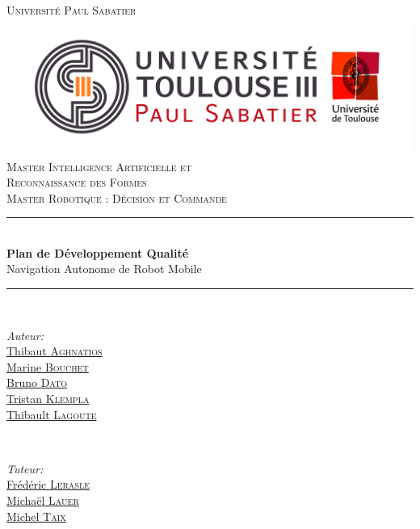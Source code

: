 \documentclass[10pt,a4paper]{article}
\begin{document}
\pagestyle {plain}

\begin{titlepage}


\newcommand{\HRule}{\rule{\linewidth}{0.5mm}} 

\center

\textsc{\Large Université Paul Sabatier}\\[1cm] 
\includegraphics[scale=0.3]{UPS.jpg}\\[0.6cm] 


\textsc{Master Intelligence Artificielle et \\ 
Reconnaissance des Formes \\ Master Robotique : Décision et Commande}\\[3cm] 

\HRule \\[0.4cm]
{ \huge \bfseries Plan de Développement Qualité}\\[0.4cm] 
\LARGE Navigation Autonome de Robot Mobile

\HRule \\[1.5cm]
 

\begin{minipage}{0.4\textwidth}
\begin{flushleft} \large
\emph{Auteur:}\\
\href{mailto:thibaut.aghnatios@laposte.net}{Thibaut \textsc{Aghnatios} }  \\
\href{mailto:bouchetmarinee@gmail.com}{Marine \textsc{Bouchet} } \\
\href{mailto:bruno.dato.meneses@gmail.com}{Bruno \textsc{Dato} } \\
\href{mailto:klempka.tristan@gmail.com}{Tristan \textsc{Klempla} } \\
\href{mailto:lagoute.31@gmail.com}{Thibault \textsc{Lagoute} }  
\end{flushleft}
\end{minipage}
~
\begin{minipage}{0.4\textwidth}
\begin{flushright} \large
\emph{Tuteur:} \\
\href{mailto:lerasle@laas.fr}{Frédéric \textsc{Lerasle}}\\
\href{mailto:michael.lauer@laas.fr}{Michaël \textsc{Lauer}} \\
\href{mailto:taix@laas.f}{Michel \textsc{Taix}}
\end{flushright}
\end{minipage}\\[5cm]


\end{titlepage}
\end{document}
